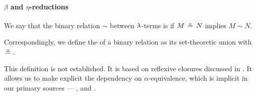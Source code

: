 \paragraph{\( \beta \) and \( \eta \)-reductions}

\begin{definition}\label{def:alpha_reflexive}\mimprovised
  We say that the binary relation \( {\sim} \) between \( \mathrm{\lambda} \)-terms is  if \( M \aequiv N \) implies \( M \sim N \).

  Correspondingly, we define the  of a binary relation as its set-theoretic union with \( {\aequiv} \).
\end{definition}
\begin{comments}
  \item This definition is not established. It is based on reflexive closures discussed in . It allows us to make explicit the dependency on \( \alpha \)-equivalence, which is implicit in our primary sources --- \cite[ch. 3]{Barendregt1984LambdaCalculus}, \cite[def. 1B2]{Hindley1997STT} and \cite[191]{Герасимов2011Вычислимость}.
\end{comments}

